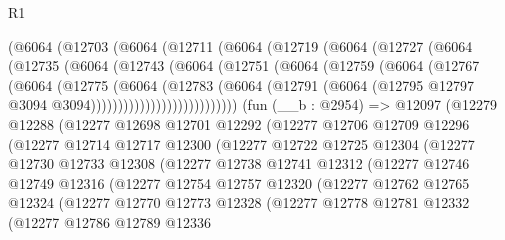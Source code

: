 \begin{lexlean}{R1}
\begin{coremodule}
      (@6064
        (@12703
          (@6064
            (@12711
              (@6064
                (@12719
                  (@6064
                    (@12727
                      (@6064
                        (@12735
                          (@6064
                            (@12743
                              (@6064
                                (@12751
                                  (@6064
                                    (@12759
                                      (@6064
                                        (@12767
                                          (@6064
                                            (@12775
                                              (@6064
                                                (@12783
                                                  (@6064
                                                    (@12791
                                                      (@6064
                                                        (@12795
                                                          @12797
                                                          @3094
                                                          @3094)))))))))))))))))))))))))))
    (fun (__b : @2954) =>
    @12097
      (@12279
        @12288
        (@12277
          @12698
          @12701
          @12292
          (@12277
            @12706
            @12709
            @12296
            (@12277
              @12714
              @12717
              @12300
              (@12277
                @12722
                @12725
                @12304
                (@12277
                  @12730
                  @12733
                  @12308
                  (@12277
                    @12738
                    @12741
                    @12312
                    (@12277
                      @12746
                      @12749
                      @12316
                      (@12277
                        @12754
                        @12757
                        @12320
                        (@12277
                          @12762
                          @12765
                          @12324
                          (@12277
                            @12770
                            @12773
                            @12328
                            (@12277
                              @12778
                              @12781
                              @12332
                              (@12277
                                @12786
                                @12789
                                @12336

\end{coremodule}
\end{lexlean}
